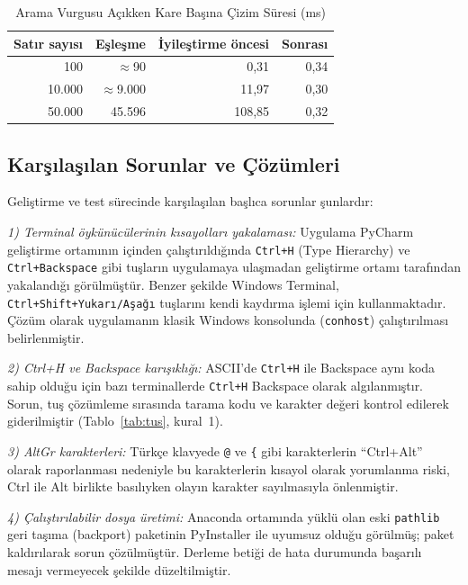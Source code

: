 \documentclass[conference,a4paper]{IEEEtran}
\newcommand{\kod}[1]{\texttt{#1}}
\begin{document}
\begin{table}[t]
\centering
\caption{Arama Vurgusu Açıkken Kare Başına Çizim Süresi (ms)}
\label{tab:cizim}
\begin{tabular}{@{}rrrr@{}}
\toprule
\textbf{Satır sayısı} & \textbf{Eşleşme} & \textbf{İyileştirme öncesi} & \textbf{Sonrası} \\
\midrule
100 & $\approx$90 & 0,31 & 0,34 \\
10.000 & $\approx$9.000 & 11,97 & 0,30 \\
50.000 & 45.596 & 108,85 & 0,32 \\
\bottomrule
\end{tabular}
\end{table}

\subsection{Karşılaşılan Sorunlar ve Çözümleri}

Geliştirme ve test sürecinde karşılaşılan başlıca sorunlar şunlardır:

\textit{1) Terminal öykünücülerinin kısayolları yakalaması:} Uygulama PyCharm geliştirme ortamının içinden çalıştırıldığında \kod{Ctrl+H} (Type Hierarchy) ve \kod{Ctrl+Backspace} gibi tuşların uygulamaya ulaşmadan geliştirme ortamı tarafından yakalandığı görülmüştür. Benzer şekilde Windows Terminal, \kod{Ctrl+Shift+Yukarı/Aşağı} tuşlarını kendi kaydırma işlemi için kullanmaktadır. Çözüm olarak uygulamanın klasik Windows konsolunda (\kod{conhost}) çalıştırılması belirlenmiştir.

\textit{2) Ctrl+H ve Backspace karışıklığı:} ASCII'de \kod{Ctrl+H} ile Backspace aynı koda sahip olduğu için bazı terminallerde \kod{Ctrl+H} Backspace olarak algılanmıştır. Sorun, tuş çözümleme sırasında tarama kodu ve karakter değeri kontrol edilerek giderilmiştir (Tablo~\ref{tab:tus}, kural~1).

\textit{3) AltGr karakterleri:} Türkçe klavyede \kod{@} ve \kod{\{} gibi karakterlerin ``Ctrl+Alt'' olarak raporlanması nedeniyle bu karakterlerin kısayol olarak yorumlanma riski, Ctrl ile Alt birlikte basılıyken olayın karakter sayılmasıyla önlenmiştir.

\textit{4) Çalıştırılabilir dosya üretimi:} Anaconda ortamında yüklü olan eski \kod{pathlib} geri taşıma (backport) paketinin PyInstaller ile uyumsuz olduğu görülmüş; paket kaldırılarak sorun çözülmüştür. Derleme betiği de hata durumunda başarılı mesajı vermeyecek şekilde düzeltilmiştir.
\end{document}
